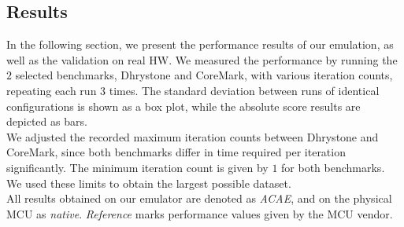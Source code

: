\documentclass[english]{tudscrartcl}
\begin{document}
		\subsection{Results}
			\label{sec:eval_results}
			In the following section, we present the performance results of our emulation, as well as the validation on real \ac{HW}.
			We measured the performance by running the $2$ selected benchmarks, Dhrystone and CoreMark, with various iteration counts, repeating each run $3$ times.
			The standard deviation between runs of identical configurations is shown as a box plot, while the absolute score results are depicted as bars.
			\\
			We adjusted the recorded maximum iteration counts between Dhrystone and CoreMark, since both benchmarks differ in time required per iteration significantly.
			The minimum iteration count is given by $1$ for both benchmarks.
			We used these limits to obtain the largest possible dataset.
			\\
			All results obtained on our emulator are denoted as \emph{\ac{ACAE}}, and on the physical \ac{MCU} as \emph{native}.
			\emph{Reference} marks performance values given by the \ac{MCU} vendor.
			\\
\end{document}
